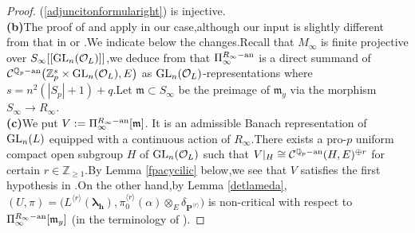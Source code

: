 \documentclass[SecEq,CM,GP]{degruyter-crelle} %
\theoremstyle{plain}
\newcommand{\ana}{{\rm an}}
\newcommand{\GLN}{{\rm GL}}
\newcommand{\lamoverx}{{L^{\lrr}({\bm\lambda}_\bh)}}
\newcommand{\lrr}{{\langle r\rangle}}
\newcommand{\op}{{\overline{{\mathbf{P}}}}}
\newcommand{\ra}{{\longrightarrow}}
\newcommand{\te}{{\otimes_E}}
\newcommand{\BQ}{{\mathbb{Q}}}
\newcommand{\BZ}{{\mathbb{Z}}}
\newcommand{\bP}{{\mathbf{P}}}
\newcommand{\bh}{{\mathbf{h}}}
\newcommand{\cC}{\mathcal C}
\newcommand{\cO}{\mathcal O}
\newcommand{\fm}{{\mathfrak{m}}}
\begin{document}
\begin{proof}
(\ref{adjuncitonformularight}) is injective.\\
\textbf{(b)}\;The proof of \cite[Theorem 4.8]{bergdall2018adjunction} and \cite[Proposition 4.7]{2019DINGSimple}
apply in our case,\;although our input is slightly different from that in \cite[Theorem 4.8]{bergdall2018adjunction} or \cite[Proposition 4.7]{2019DINGSimple}.\;We indicate below the changes.\;Recall that $M_{\infty}$ is finite projective over $S_{\infty}[[\GLN_n(\cO_L)]]$,\;we deduce from \cite[Corollary 3.9]{breuil2017interpretation} that $\Pi_{\infty}^{R_{\infty}-\ana}$ is a direct summand of $\cC^{\BQ_p-\ana}\big(\BZ_p^s \times \GLN_n(\cO_L),E\big)$ as $\GLN_n(\cO_L)$-representations where $s=n^2(|S_p|+1)+q$.\;Let $\fm \subset S_{\infty}$ be the preimage of $\fm_y$ via the morphism $S_{\infty} \ra R_{\infty}$.\;\\
\textbf{(c)}\;We put $V:=\Pi_{\infty}^{R_{\infty}-\ana}[\fm]$.\;
It is an admissible Banach representation of $\GLN_n(L)$ equipped with a continuous action of $R_{\infty}$.\;There exists a 
pro-$p$ uniform compact open subgroup $H$ of $\GLN_n(\cO_L)$ such that  $V|_{H}\cong \cC^{\BQ_p-\ana}(H,E)^{\oplus r}$ for certain $r\in \BZ_{\geq 1}$.\;By Lemma \ref{fpacycilic} below,\;we see that $V$ satisfies the first hypothesis in  \cite[Theorem 4.8]{bergdall2018adjunction}.\;On the other hand,\;by Lemma \ref{detlameda},\;$(U,\pi)=\Big(\lamoverx,\pi_0^{\lrr}(\alpha)\te \delta_{\bP^{\lrr}}\Big)$ is non-critical with respect to $\Pi_{\infty}^{R_{\infty}-\ana}[\fm_y]$ (in the terminology of \cite[Definition 4.4]{bergdall2018adjunction}).\;


\end{proof}
\end{document}
